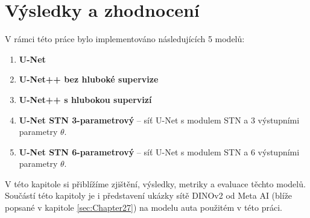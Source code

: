 \chapter{Výsledky a zhodnocení}
\label{sec:Chapter6}
V rámci této práce bylo implementováno následujících 5 modelů:
\begin{enumerate}
    \item \textbf{U-Net}
    \item \textbf{U-Net++ bez hluboké supervize} 
    \item \textbf{U-Net++ s hlubokou supervizí}
    \item \textbf{U-Net STN 3-parametrový} -- síť U-Net s modulem STN a 3 výstupními parametry $\theta$.
    \item \textbf{U-Net STN 6-parametrový} -- síť U-Net s modulem STN a 6 výstupními parametry $\theta$.
\end{enumerate}
V této kapitole si přiblížíme zjištění, výsledky, metriky a evaluace těchto modelů. Součástí této kapitoly je i představení ukázky sítě DINOv2 od Meta AI (blíže popsané v kapitole \ref{sec:Chapter27}) na modelu auta použitém v této práci.

\endinput